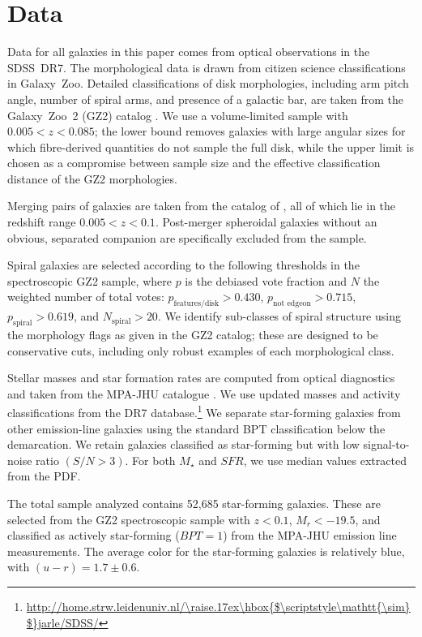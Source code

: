 \documentclass{emulateapj}
\newcommand{\mytilde}{\raise.17ex\hbox{$\scriptstyle\mathtt{\sim}$}}
\begin{document}

\section{Data} \label{sec-data}

Data for all galaxies in this paper comes from optical observations in the SDSS~DR7. The morphological data is drawn from citizen science classifications in Galaxy~Zoo. Detailed classifications of disk morphologies, including arm pitch angle, number of spiral arms, and presence of a galactic bar, are taken from the Galaxy~Zoo~2 (GZ2) catalog \citep{wil13}. We use a volume-limited sample with $0.005<z<0.085$; the lower bound removes galaxies with large angular sizes for which fibre-derived quantities do not sample the full disk, while the upper limit is chosen as a compromise between sample size and the effective classification distance of the GZ2 morphologies.

Merging pairs of galaxies are taken from the catalog of \citet{dar10a}, all of which lie in the redshift range $0.005<z<0.1$. Post-merger spheroidal galaxies without an obvious, separated companion are specifically excluded from the sample.

Spiral galaxies are selected according to the following thresholds in the spectroscopic GZ2 sample, where $p$ is the debiased vote fraction and $N$ the weighted number of total votes: $p_\textrm{features/disk} > 0.430$, $p_\textrm{not~edgeon} > 0.715$, $p_\textrm{spiral}>0.619$, and $N_\textrm{spiral}>20$. We identify sub-classes of spiral structure using the morphology flags as given in the GZ2 catalog; these are designed to be conservative cuts, including only robust examples of each morphological class. 

Stellar masses and star formation rates are computed from optical diagnostics and taken from the MPA-JHU catalogue \citep{kau03a,bri04,sal07}. We use updated masses and activity classifications from the DR7 database.\footnote{\url{http://home.strw.leidenuniv.nl/\mytilde jarle/SDSS/}} We separate star-forming galaxies from other emission-line galaxies using the standard BPT classification \citep{bal81} below the \citet{kau03} demarcation. We retain galaxies classified as star-forming but with low signal-to-noise ratio $(S/N > 3)$. For both $M_\star$ and $SFR$, we use median values extracted from the PDF.

The total sample analyzed contains 52,685 star-forming galaxies. These are selected from the GZ2 spectroscopic sample with $z<0.1$, $M_r<-19.5$, and classified as actively star-forming ($BPT=1$) from the MPA-JHU emission line measurements. The average color for the star-forming galaxies is relatively blue, with $(u-r)=1.7\pm0.6$. 
\end{document}
